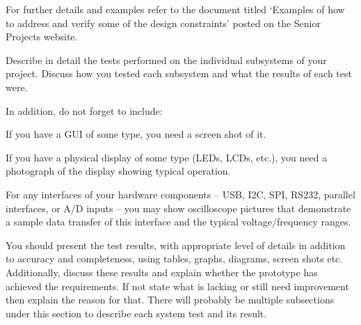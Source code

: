 \documentclass[../main.tex]{subfiles}
\begin{document}
\begin{newrequirements}
\begin{todolist}
    \item For further details and examples refer 
        to the document titled ‘Examples of how 
        to address and verify some of the 
        design constraints’ posted on the 
        Senior Projects website. 
         
    \item Describe in detail the tests performed 
        on the individual subsystems of your 
        project.  Discuss how you tested each 
        subsystem and what the results of each 
        test were. 

    \item In addition, do not forget to include: 

    \begin{todolist}
    \item If you have a GUI of some type, you 
        need a screen shot of it. 

    \item If you have a physical display of some 
        type (LEDs, LCDs, etc.), you need a 
        photograph of the display showing 
        typical operation. 

    \item For any interfaces of your hardware 
        components – USB, I2C, SPI, RS232, 
        parallel interfaces, or A/D inputs – 
        you may show oscilloscope pictures that 
        demonstrate a sample data transfer of 
        this interface and the typical 
        voltage/frequency ranges. 
    \end{todolist}

    \item You should present the test results, 
        with appropriate level of details in 
        addition to accuracy and completeness, 
        using tables, graphs, diagrams, screen 
        shots etc. Additionally, discuss these 
        results and explain whether the 
        prototype has achieved the 
        requirements. If not state what is 
        lacking or still need improvement then 
        explain the reason for that. There will 
        probably be multiple subsections under 
        this section to describe each system 
        test and its result. 

    \end{todolist}
\end{newrequirements}
\end{document}
